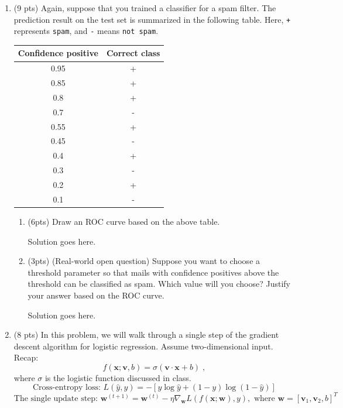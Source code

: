 \documentclass[a4paper]{article}
\theoremstyle{definition}
\renewcommand\vec[1]{\mathbf{#1}}
\newenvironment{soln}{
    \leavevmode\color{blue}\ignorespaces
}{}
\begin{document}
\begin{enumerate}
\item (9 pts) Again, suppose that you trained a classifier for a spam filter. The prediction result on the test set is summarized in the following table. Here, {\tt +} represents {\tt spam}, and {\tt -} means {\tt not spam}.

\begin{center}
\begin{tabular}{ c  c }
\hline
Confidence positive & Correct class \\ \hline
0.95 & + \\
0.85 & + \\
0.8 & + \\
0.7 & - \\
0.55 & + \\
0.45 & - \\
0.4 & + \\
0.3 & - \\
0.2 & + \\
0.1 & - \\
\hline
\end{tabular}
\end{center}

\begin{enumerate}
	\item (6pts) Draw an ROC curve based on the above table.
	
	\begin{soln}  Solution goes here. \end{soln}
	
	\item (3pts) (Real-world open question) Suppose you want to choose a threshold parameter so that mails with confidence positives above the threshold can be classified as spam. Which value will you choose? Justify your answer based on the ROC curve.
	
	\begin{soln}  Solution goes here. \end{soln}
\end{enumerate}

\item (8 pts) In this problem, we will walk through a single step of the gradient descent algorithm for logistic regression. Assume two-dimensional input.
Recap:
$$f(\vec x;\vec v, b) = \sigma(\vec v \cdot \vec x + b) \;,$$
where $\sigma$ is the logistic function discussed in class.
$$\text{Cross-entropy loss: } L(\hat{y}, y) = -[y \log  \hat{y} + (1-y)\log(1-\hat{y})]$$
$$\text{The single update step: } \vec w^{(t+1)} = \vec w^{(t)} - \eta \nabla_{\vec w} L(f(\vec x;\vec w), y),\text{ where } \vec w=[\vec v_{1}, \vec v_{2}, b]^T $$


\end{enumerate}
\end{document}
